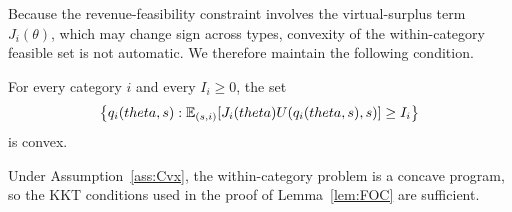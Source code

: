 \documentclass[master.tex]{subfiles}
\begin{document}
Because the revenue-feasibility constraint involves the virtual-surplus term $J_i(\theta)$, which may change sign across types, convexity of the within-category feasible set is not automatic. We therefore maintain the following condition.

\begin{assumption}\label{ass:Cvx}
For every category $i$ and every $I_i \ge 0$, the set
\[
\left\{
q_i(theta,s):
\mathbb{E}_{(s,i)}\!\left[J_i(theta)U(q_i(theta,s),s)\right] \ge I_i
\right\}
\]
is convex.
\end{assumption}

Under Assumption~\ref{ass:Cvx}, the within-category problem is a concave program, so the KKT conditions used in the proof of Lemma~\ref{lem:FOC} are sufficient.
\end{document}
